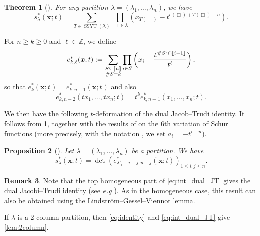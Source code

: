 \documentclass[12pt]{amsart}
\newtheorem{thm}{Theorem}[section]
\newtheorem{prop}[thm]{Proposition}
\theoremstyle{definition}
\newtheorem{remark}[thm]{Remark}
\newcommand{\bfx}{\boldsymbol{x}}
\DeclareMathOperator{\SSYT}{SSYT}
\newcommand{\ZZ}{\mathbb Z}
\begin{document}
\begin{appendices}
\begin{thm}[\cite{Okounkov1998}]\label{thm:Okounkov}
For any partition $\lambda=(\lambda_1,\dots,\lambda_n)$, we have
$$s^*_\lambda(\bfx;t)=\sum_{T\in \SSYT(\lambda)}\prod_{\Box\in \lambda}(x_{T(\Box)}-t^{c(\Box)+T(\Box)-n}).$$
\end{thm}

For $n\geq k\geq 0$ and $\ell\in \ZZ$, we define
$$e_{k,\ell}^*(\bfx;t):=\sum_{\begin{subarray}{c}S\subseteq \llbracket n \rrbracket\\  \#S=k\end{subarray}}\prod_{i\in S}\left(x_i-\frac{t^{\#S^c\cap \llbracket i-1\rrbracket}}{t^{\ell}}\right),$$
so that $e^*_k(\bfx;t)=e^*_{k,n-1}(\bfx;t)$
and also
\begin{equation}\label{eq:identity}
e^*_{k,n-2}(tx_1,\dots,tx_n;t) = t^k e^*_{k,n-1}(x_1,\dots,x_n;t).    
\end{equation}


We then have the following $t$-deformation of the dual Jacob–Trudi identity. It follows from \cref{thm:Okounkov}, together with the results of \cite{Macdonald1992} on the 6th variation of Schur functions (more precisely, with the notation \cite[Section6]{Macdonald1992}, we set $a_i=-t^{i-n}$).

\begin{prop}[\cite{Macdonald1992}]
    Let $\lambda=(\lambda_1,\dots,\lambda_{n})$ be a partition. We have
    \begin{equation}\label{eq:int_dual_JT}
      s^*_\lambda(\bfx;t)=\det\left(e^*_{\lambda'_i-i+j, n-j}(\bfx;t)\right)_{1\leq i,j\leq n}.  
    \end{equation}
\end{prop}

\begin{remark}
    Note that the top homogeneous part of \cref{eq:int_dual_JT} gives the dual Jacobi–Trudi identity (see \textit{e.g} \cite[Corollary 7.16.2]{Stanley:EC2}). As in the homogeneous case, this result can also be obtained using the Lindström–Gessel–Viennot lemma.
\end{remark}

If $\lambda$ is a 2-column partition, then \cref{eq:identity} and \cref{eq:int_dual_JT} give 
\cref{lem:2column}.













\end{appendices}





   
\end{document}
